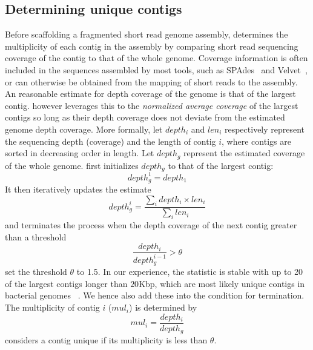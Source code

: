 \subsection{Determining unique contigs}
Before scaffolding a fragmented short read genome assembly, \npscarf{}
determines the multiplicity of each contig in the assembly by comparing short
read sequencing coverage of the contig to that of the whole genome. Coverage
information is often included in the sequences assembled by most tools, such as
SPAdes~\cite{BankevichNA2012} and Velvet~\cite{Zerbino2008}, or can otherwise 
be obtained from the mapping of short reads to the assembly. 
An reasonable estimate for depth coverage of the genome is that of the largest
contig. \npscarf{} however leverages this to the \emph{normalized average
coverage} of the largest contigs so long as their depth coverage does not
deviate from the estimated genome depth coverage.
More formally, let $depth_i$ and $len_i$ respectively represent the sequencing
depth (coverage) and the length of contig $i$, where contigs are sorted in
decreasing order in length. Let $depth_g$ represent the estimated coverage
of the whole genome. \npscarf{} first initializes $depth_g$ to that of the
largest contig:
\begin{equation}\label{E:depth}
depth_g^1 = depth_1
\end{equation}
It then iteratively updates the estimate   
\begin{equation}\label{E:gdepth}
depth_g^i = \dfrac{\sum_i depth_i \times len_i}{\sum_i len_i} 
\end{equation}
and terminates the process when the depth coverage of the next contig greater
than a threshold
\begin{equation}\label{E:cov}
\dfrac{depth_i}{depth_g^{i-1}} > \theta
\end{equation}
\npscarf{} set the threshold $\theta$ to 1.5. In our experience, the statistic is
stable with up to 20 of the largest contigs longer than $20$Kbp, which are most
likely unique contigs in bacterial genomes ~\cite{KorenP2015}. We hence also
add these into the condition for termination.
The multiplicity of contig $i$ ($mul_i$) is determined by
\begin{equation}\label{E:mul}
mul_i= \dfrac{depth_i}{depth_g}
\end{equation}
\npscarf{} considers a contig unique if its multiplicity is less than $\theta$.
 

